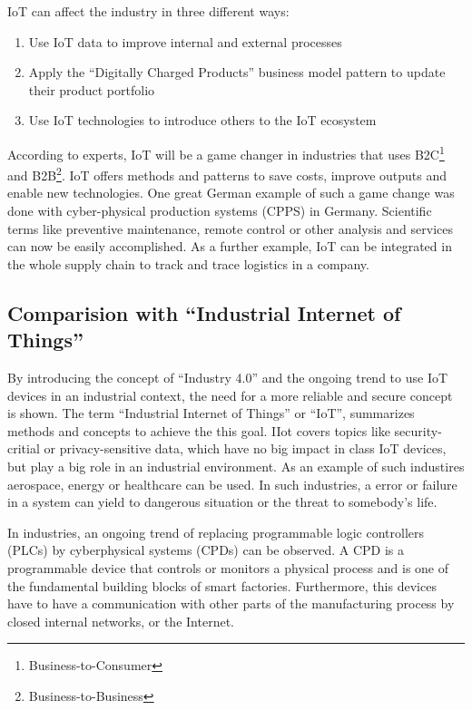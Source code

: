 IoT can affect the industry in three different ways: \cite{iotfleisch2}
\begin{enumerate}
	\item Use IoT data to improve internal and external processes
	\item Apply the ``Digitally Charged Products'' business model pattern to update their product portfolio
	\item Use IoT technologies to introduce others to the IoT ecosystem
\end{enumerate}

According to experts, IoT will be a game changer in industries that uses B2C\footnote{Business-to-Consumer} and B2B\footnote{Business-to-Business}. IoT offers methods and patterns to save costs, improve outputs and enable new technologies. One great German example of such a game change was done with cyber-physical production systems (CPPS) in Germany. Scientific terms like preventive maintenance, remote control or other analysis and services can now be easily accomplished. As a further example, IoT can be integrated in the whole supply chain to track and trace logistics in a company. \cite{iotfleisch2}

\subsection{Comparision with ``Industrial Internet of Things''}
By introducing the concept of ``Industry 4.0'' and the ongoing trend to use IoT devices in an industrial context, the need for a more reliable and secure concept is shown. The term ``Industrial Internet of Things'' or ``IoT'', summarizes methods and concepts to achieve the this goal. IIot covers topics like security-critial or privacy-sensitive data, which have no big impact in class IoT devices, but play a big role in an industrial environment\cite{iiot}. As an example of such industires aerospace, energy or healthcare can be used. In such industries, a error or failure in a system can yield to dangerous situation or the threat to somebody's life\cite{iiot2}.

In industries, an ongoing trend of replacing programmable logic controllers (PLCs) by cyberphysical systems (CPDs) can be observed. A CPD is a programmable device that controls or monitors a physical process and is one of the fundamental building blocks of smart factories. Furthermore, this devices have to have a communication with other parts of the manufacturing process by closed internal networks, or the Internet\cite{iiot}.

